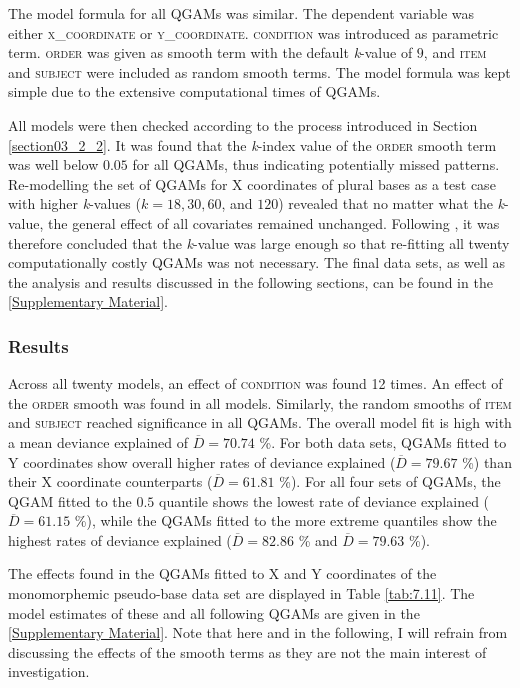 The model formula for all QGAMs was similar. The dependent variable was either \textsc{x\_coordinate} or \textsc{y\_coordinate}. \textsc{condition} was introduced as parametric term. \textsc{order} was given as smooth term with the default \textit{k}-value of $9$, and \textsc{item} and \textsc{subject} were included as random smooth terms. The model formula was kept simple due to the extensive computational times of QGAMs. 

All models were then checked according to the process introduced in Section \ref{section03_2_2}. It was found that the \textit{k}-index value of the \textsc{order} smooth term was well below $0.05$ for all QGAMs, thus indicating potentially missed patterns. Re-modelling the set of QGAMs for X coordinates of plural bases as a test case with higher \textit{k}-values ($k=18,30,60$, and $120$) revealed that no matter what the \textit{k}-value, the general effect of all covariates remained unchanged. Following \citet{Wood2017}, it was therefore concluded that the \textit{k}-value was large enough so that re-fitting all twenty computationally costly QGAMs was not necessary. The final data sets, as well as the analysis and results discussed in the following sections, can be found in the \ref{Supplementary Material}.

\subsubsection{Results}\label{section07_2_3_2}

Across all twenty models, an effect of \textsc{condition} was found 12 times. An effect of the \textsc{order} smooth was found in all models. Similarly, the random smooths of \textsc{item} and \textsc{subject} reached significance in all QGAMs. The overall model fit is high with a mean deviance explained of $\overline{D}=70.74$ \%. For both data sets, QGAMs fitted to Y coordinates show overall higher rates of deviance explained ($\overline{D}=79.67$ \%) than their X coordinate counterparts ($\overline{D}=61.81$ \%). For all four sets of QGAMs, the QGAM fitted to the $0.5$ quantile shows the lowest rate of deviance explained ($\overline{D}=61.15$ \%), while the QGAMs fitted to the more extreme quantiles show the highest rates of deviance explained ($\overline{D}=82.86$ \% and $\overline{D}=79.63$ \%).

The effects found in the QGAMs fitted to X and Y coordinates of the monomorphemic pseudo-base data set are displayed in Table \ref{tab:7.11}. The model estimates of these and all following QGAMs are given in the \ref{Supplementary Material}. Note that here and in the following, I will refrain from discussing the effects of the smooth terms as they are not the main interest of investigation. 

